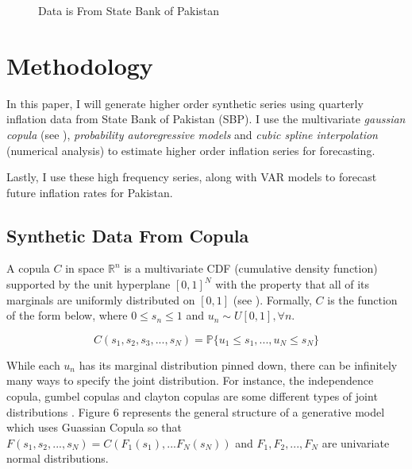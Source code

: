 \documentclass[12pt]{article}
\newcommand{\1}{\mathbbm 1}
\begin{document}
		\begin{figure}[H]
			\centering
			\scalebox{0.8}{}
			\hfill
			\caption{Data is From State Bank of Pakistan}
		\end{figure}
		
		\section{Methodology}
		
		
		
		
		In this paper, I will generate higher order synthetic series using quarterly inflation data from State Bank of Pakistan (SBP). I use the multivariate \textit{gaussian copula} (see \cite{patki2016synthetic}), \textit{probability autoregressive models} and \textit{cubic spline interpolation} (numerical analysis) to estimate higher order inflation series for forecasting. 
		
		Lastly, I use these high frequency series, along with VAR models to forecast future inflation rates for Pakistan.
		
		
		
		
		\subsection{Synthetic Data From Copula}
		
		A copula $C$ in space $\mathbb{R}^{n}$ is a multivariate CDF (cumulative density function) supported by the unit hyperplane $[0,1]^{N}$ with the property that all of its marginals are uniformly distributed on $[0,1]$ (see \cite{stachurski2016primer}). Formally, $C$ is the function of the form below, where $0 \leq s_{n} \leq 1$ and $u_{n} \sim U[0, 1], \forall n$.
		
		\begin{equation}
			C(s_{1}, s_{2}, s_{3}, ... ,s_{N}) = \mathbb{P}\{u_{1} \leq s_{1}, ... , u_{N} \leq s_{N}\}
		\end{equation}
		
		While each $u_{n}$ has its marginal distribution pinned down, there can be infinitely many ways to specify the joint distribution. For instance, the independence copula, gumbel copulas and clayton copulas are some different types of joint distributions \cite{stachurski2016primer}. Figure 6 represents the general structure of a generative model which uses Guassian Copula so that $F(s_{1}, s_{2}, ..., s_{N}) = C(F_{1}(s_{1}), ... F_{N}(s_{N}))$ and $F_{1}, F_{2}, ... ,F_{N}$ are univariate normal distributions.
		
\end{document}
